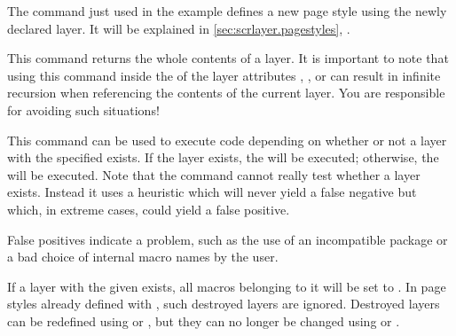 The 
command just used in the example defines a new page style using the newly
declared layer. It will be explained in \autoref{sec:scrlayer.pagestyles},
.%
\EndIndexGroup


\begin{Declaration}
\end{Declaration}
This command returns the whole contents
of a layer. It is important to note that using this
command inside the  of the layer attributes ,
, or  can result in
infinite recursion when referencing the contents of the current layer. You
are responsible for avoiding such situations!%
\EndIndexGroup


\begin{Declaration}
\end{Declaration}
This command can be used to execute code depending on whether or not a layer
with the specified  exists. If the layer exists, the
 will be executed; otherwise, the  will be
executed. Note that the command cannot really test whether a layer exists.
Instead it uses a heuristic which will never yield a false negative but which,
in extreme cases, could yield a false positive.
\iffalse%
Nevertheless, if the test yields a false positive, something has gone wrong.
For example, this could indicate an incompatible package or that the user is
doing something he or she should not.%
\else
False positives indicate a problem, such as the use of an incompatible package
or a bad choice of internal macro names by the user.
\fi
\EndIndexGroup


\begin{Declaration}
\end{Declaration}
If a layer with the given  exists, all macros belonging to
it will be set to . In page styles already defined with
, such destroyed layers are ignored. Destroyed layers can be
redefined using  or
, but they can no longer be changed using
 or
.

